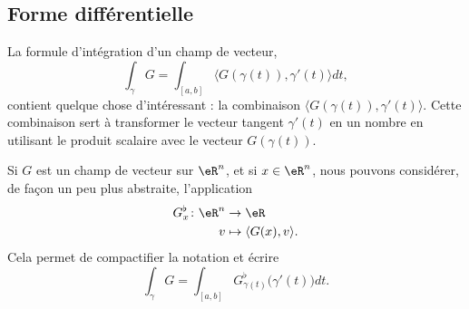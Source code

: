 \subsection{Forme différentielle}

La formule d'intégration d'un champ de vecteur,
\begin{equation}
	\int_{\gamma}G=\int_{[a,b]}\langle G (\gamma(t)), \gamma'(t)\rangle dt,
\end{equation}
contient quelque chose d'intéressant : la combinaison $\langle G( \gamma(t) ), \gamma'(t)\rangle$. Cette combinaison sert à transformer le vecteur tangent $\gamma'(t)$ en un nombre en utilisant le produit scalaire avec le vecteur $G( \gamma(t) )$.

Si $G$ est un champ de vecteur sur $\eR^n$, et si $x\in\eR^n$, nous pouvons considérer, de façon un peu plus abstraite, l'application
\begin{equation}		\label{EqDefBemol}
	\begin{aligned}[]
		G^{\flat}_x\colon \eR^n&\to \eR \\
			v&\mapsto \langle G(x), v\rangle . 
	\end{aligned}
\end{equation}
Cela permet de compactifier la notation et écrire
\begin{equation}
	\int_{\gamma}G=\int_{[a,b]} G^{\flat}_{\gamma(t)}\big( \gamma'(t)\big) dt.
\end{equation}

